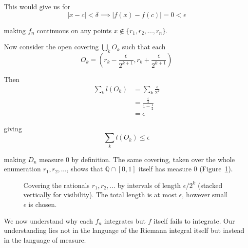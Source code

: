 \documentclass[12pt]{article}
\theoremstyle{plain}
\theoremstyle{definition}
\theoremstyle{definition}
\theoremstyle{remark}
\begin{document}
This would give us for 
\begin{equation*}
    |x - c| < \delta \implies |f(x) - f(c)| = 0 < \epsilon
\end{equation*} 

making $f_n$ continuous on any points $x \not\in \{r_1, r_2, \ldots, r_n\}$. 

Now consider the open covering
$\bigcup_k O_k$ such that each 
\begin{equation*}
    O_k = (r_k - \frac{\epsilon}{2^{k+1}}, r_k + \frac{\epsilon}{2^{k+1}})
\end{equation*}

Then
\begin{align*}
    \sum_k l(O_k) &= \sum_k \frac{\epsilon}{2^{k}} \\
    &= \frac{\frac{\epsilon}{2}}{1 - \frac{1}{2}} \\
    &= \epsilon 
\end{align*}

giving 
\begin{equation*}
    \sum_k l(O_k) \leq \epsilon
\end{equation*} 

making $D_n$ measure 0 by definition. The same covering, taken over the whole
enumeration $r_1, r_2, \ldots$, shows that $\mathbb{Q} \cap [0, 1]$ itself has measure 0
(Figure~\ref{fig:cover}).

\begin{figure}[h]
\centering
{}
\caption{Covering the rationals $r_1, r_2, \ldots$ by intervals of length $\epsilon/2^k$
(stacked vertically for visibility). The total length is at most $\epsilon$, however small
$\epsilon$ is chosen.}
\label{fig:cover}
\end{figure}

We now understand why each $f_n$ integrates but $f$ itself fails to integrate.
Our understanding lies not in the language of the Riemann integral itself but instead in the
language of measure.  
\end{document}
